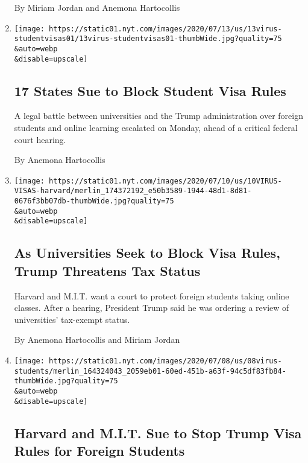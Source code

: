 \begin{enumerate}
  By Miriam Jordan and Anemona Hartocollis
\item
  \href{/2020/07/13/us/f1-student-visas-trump.html}{}

  \texttt{[image: https://static01.nyt.com/images/2020/07/13/us/13virus-studentvisas01/13virus-studentvisas01-thumbWide.jpg?quality=75\\\&auto=webp\\\&disable=upscale]}

  \hypertarget{17-states-sue-to-block-student-visa-rules}{%
  \subsection{17 States Sue to Block Student Visa
  Rules}\label{17-states-sue-to-block-student-visa-rules}}

  A legal battle between universities and the Trump administration over
  foreign students and online learning escalated on Monday, ahead of a
  critical federal court hearing.

  By Anemona Hartocollis
\item
  \href{/2020/07/10/us/f1-student-visa-lawsuit.html}{}

  \texttt{[image: https://static01.nyt.com/images/2020/07/10/us/10VIRUS-VISAS-harvard/merlin\_174372192\_e50b3589-1944-48d1-8d81-0676f3bb07db-thumbWide.jpg?quality=75\\\&auto=webp\\\&disable=upscale]}

  \hypertarget{as-universities-seek-to-block-visa-rules-trump-threatens-tax-status}{%
  \subsection{As Universities Seek to Block Visa Rules, Trump Threatens
  Tax
  Status}\label{as-universities-seek-to-block-visa-rules-trump-threatens-tax-status}}

  Harvard and M.I.T. want a court to protect foreign students taking
  online classes. After a hearing, President Trump said he was ordering
  a review of universities' tax-exempt status.

  By Anemona Hartocollis and Miriam Jordan
\item
  \href{/2020/07/08/us/harvard-mit-trump-ice-students.html}{}

  \texttt{[image: https://static01.nyt.com/images/2020/07/08/us/08virus-students/merlin\_164324043\_2059eb01-60ed-451b-a63f-94c5df83fb84-thumbWide.jpg?quality=75\\\&auto=webp\\\&disable=upscale]}

  \hypertarget{harvard-and-mit-sue-to-stop-trump-visa-rules-for-foreign-students}{%
  \subsection{Harvard and M.I.T. Sue to Stop Trump Visa Rules for
  Foreign
  Students}\label{harvard-and-mit-sue-to-stop-trump-visa-rules-for-foreign-students}}


\end{enumerate}
